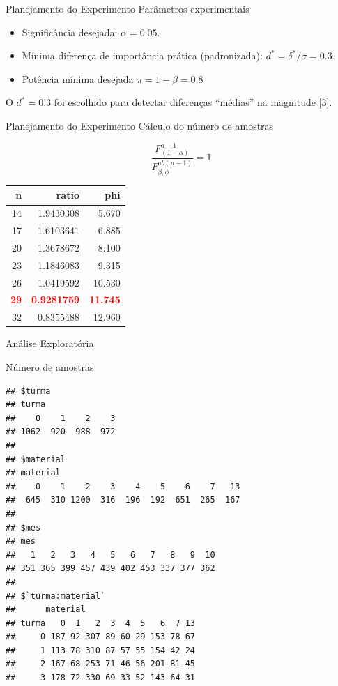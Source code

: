 \documentclass[
  ignorenonframetext,
]{beamer}
\providecommand{\tightlist}{%
  \setlength{\itemsep}{0pt}\setlength{\parskip}{0pt}}
\begin{document}
\begin{frame}{Planejamento do Experimento \textbar{} Parâmetros
experimentais}
\protect\hypertarget{planejamento-do-experimento-parametros-experimentais}{}

\begin{itemize}
\tightlist
\item
  Significância desejada: \(\alpha = 0.05\).
\item
  Mínima diferença de importância prática (padronizada):
  \(d^* = \delta^*/\sigma = 0.3\)
\item
  Potência mínima desejada \(\pi = 1 - \beta = 0.8\)
\end{itemize}

O \(d^* = 0.3\) foi escolhido para detectar diferenças ``médias'' na
magnitude {[}3{]}.

\end{frame}

\begin{frame}{Planejamento do Experimento \textbar{} Cálculo do número
de amostras}
\protect\hypertarget{planejamento-do-experimento-calculo-do-numero-de-amostras}{}

\[ \frac{F_{(1- \alpha)}^{a-1}}{F_{\beta, \phi}^{ab(n-1)}} = 1\]

\begin{table}[H]
\centering
\begin{tabular}{r|r|r}
\hline
n & ratio & phi\\
\hline
14 & 1.9430308 & 5.670\\
\hline
17 & 1.6103641 & 6.885\\
\hline
20 & 1.3678672 & 8.100\\
\hline
23 & 1.1846083 & 9.315\\
\hline
26 & 1.0419592 & 10.530\\
\hline
\textcolor{red}{\textbf{29}} & \textcolor{red}{\textbf{0.9281759}} & \textcolor{red}{\textbf{11.745}}\\
\hline
32 & 0.8355488 & 12.960\\
\hline
\end{tabular}
\end{table}

\end{frame}

\begin{frame}[fragile]{Análise Exploratória}
\protect\hypertarget{analise-exploratoria}{}

Número de amostras

\begin{verbatim}
## $turma
## turma
##    0    1    2    3 
## 1062  920  988  972 
## 
## $material
## material
##    0    1    2    3    4    5    6    7   13 
##  645  310 1200  316  196  192  651  265  167 
## 
## $mes
## mes
##   1   2   3   4   5   6   7   8   9  10 
## 351 365 399 457 439 402 453 337 377 362 
## 
## $`turma:material`
##      material
## turma   0  1   2  3  4  5   6  7 13
##     0 187 92 307 89 60 29 153 78 67
##     1 113 78 310 87 57 55 154 42 24
##     2 167 68 253 71 46 56 201 81 45
##     3 178 72 330 69 33 52 143 64 31
\end{verbatim}

\end{frame}
\end{document}
